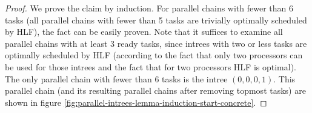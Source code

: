 \begin{proof}
  \newcommand{\iminus}[1]{I\setminus\{#1\}}

  We prove the claim by induction. For parallel chains with fewer than 6 tasks (all parallel chains with fewer than 5 tasks are trivially optimally scheduled by HLF), the fact can be easily proven. Note that it suffices to examine all parallel chains with at least 3 ready tasks, since intrees with two or less tasks are optimally scheduled by HLF (according to the fact that only two processors can be used for those intrees and the fact that for two processors HLF is optimal). The only parallel chain with fewer than 6 tasks is the intree $(0,0,0,1)$. This parallel chain (and its resulting parallel chains after removing topmost tasks) are shown in figure       \ref{fig:parallel-intrees-lemma-induction-start-concrete}.


\end{proof}
